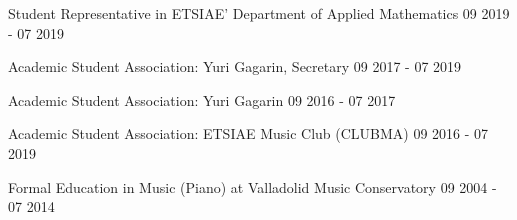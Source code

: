 Student Representative in ETSIAE' Department of Applied Mathematics	\hfill 09 2019 - 07 2019

Academic Student Association: Yuri Gagarin, Secretary	\hfill 09 2017 - 07 2019

Academic Student Association: Yuri Gagarin	\hfill 09 2016 - 07 2017

Academic Student Association: ETSIAE Music Club (CLUBMA)	\hfill 09 2016 - 07 2019

Formal Education in Music (Piano)  at Valladolid Music Conservatory \hfill 09 2004 - 07 2014

